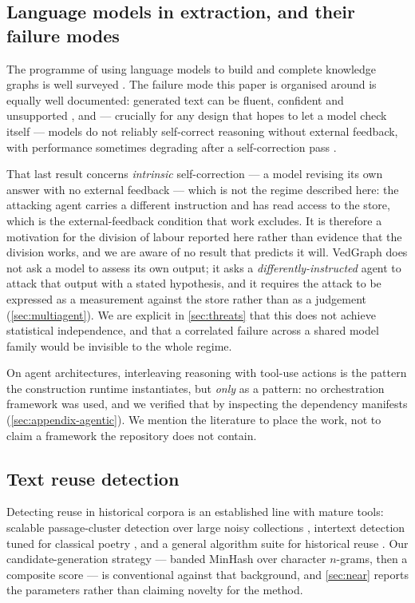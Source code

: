 \subsection{Language models in extraction, and their failure modes}

The programme of using language models to build and complete knowledge graphs is
well surveyed \citep{pan2024unifying}. The failure mode this paper is organised
around is equally well documented: generated text can be fluent, confident and
unsupported \citep{ji2023hallucination}, and --- crucially for any design that hopes
to let a model check itself --- models do not reliably self-correct reasoning
without external feedback, with performance sometimes degrading after a
self-correction pass \citep{huang2024selfcorrect}.

That last result concerns \emph{intrinsic} self-correction --- a model revising its
own answer with no external feedback --- which is not the regime described here: the
attacking agent carries a different instruction and has read access to the store,
which is the external-feedback condition that work excludes. It is therefore a
motivation for the division of labour reported here rather than evidence that the
division works, and we are aware of no result that predicts it will.
VedGraph does not ask a model to assess its own output; it asks a
\emph{differently-instructed} agent to attack that output with a stated hypothesis,
and it requires the attack to be expressed as a measurement against the store rather
than as a judgement (\cref{sec:multiagent}). We are explicit in
\cref{sec:threats} that this does not achieve statistical independence, and that a
correlated failure across a shared model family would be invisible to the whole
regime.

On agent architectures, interleaving reasoning with tool-use actions
\citep{yao2023react} is the pattern the construction runtime instantiates, but
\emph{only} as a pattern: no orchestration framework was used, and we verified that
by inspecting the dependency manifests (\cref{sec:appendix-agentic}). We mention the
literature to place the work, not to claim a framework the repository does not
contain.

\subsection{Text reuse detection}

Detecting reuse in historical corpora is an established line with mature tools:
scalable passage-cluster detection over large noisy collections
\citep{smith2013infectious}, intertext detection tuned for classical poetry
\citep{coffee2013tesserae}, and a general algorithm suite for historical reuse
\citep{buechler2014tracer}. Our candidate-generation strategy --- banded MinHash over
character $n$-grams, then a composite score --- is conventional against that
background, and \cref{sec:near} reports the parameters rather than claiming novelty
for the method.

